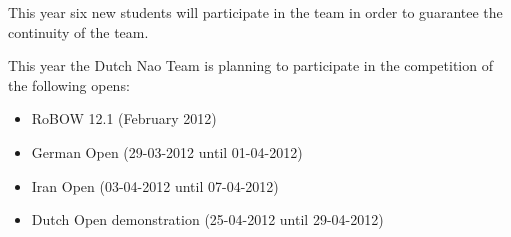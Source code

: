 \documentclass[11pt]{article}
\begin{document}
This year six new students will participate in the team in order to guarantee the continuity of the team. 

This year the Dutch Nao Team is planning to participate in the competition of the following opens:
\begin{itemize}
\item RoBOW 12.1 (February 2012)
\item German Open (29-03-2012 until 01-04-2012)
\item Iran Open (03-04-2012 until 07-04-2012)
\item Dutch Open demonstration (25-04-2012 until 29-04-2012)
\end{itemize}

\end{document}
